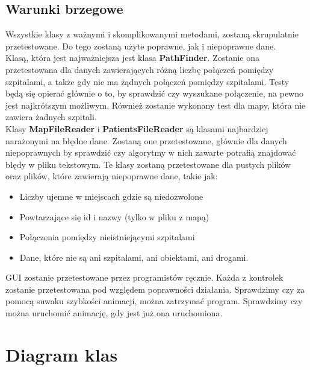 \documentclass[]{article}
\begin{document}
        \subsection{Warunki brzegowe}
        Wszystkie klasy z ważnymi i skomplikowanymi metodami, zostaną skrupulatnie przetestowane. Do tego zostaną użyte poprawne, jak i niepoprawne dane.
        \\
        Klasą, która jest najważniejsza jest klasa \textbf{PathFinder}. 
        Zostanie ona przetestowana dla danych zawierających różną liczbę połączeń pomiędzy szpitalami, a także gdy nie ma żądnych połączeń pomiędzy szpitalami.
        Testy będą się opierać głównie o to, by sprawdzić czy wyszukane połączenie, na pewno jest najkrótszym możliwym.
        Również zostanie wykonany test dla mapy, która nie zawiera żadnych szpitali.
        \\
        Klasy \textbf{MapFileReader} i \textbf{PatientsFileReader} są klasami najbardziej narażonymi na błędne dane.
        Zostaną one przetestowane, głównie dla danych niepoprawnych by sprawdzić
        czy algorytmy w nich zawarte potrafią znajdować błędy w pliku tekstowym.
        Te klasy zostaną przetestowane dla pustych plików oraz plików, które zawierają niepoprawne dane, takie jak:
        \begin{itemize}
            \item Liczby ujemne w miejscach gdzie są niedozwolone
            \item Powtarzające się id i nazwy (tylko w pliku z mapą)
            \item Połączenia pomiędzy nieistniejącymi szpitalami
            \item Dane, które nie są ani szpitalami, ani obiektami, ani drogami.
        \end{itemize}
        GUI zostanie przetestowane przez programistów ręcznie.
        Każda z kontrolek zostanie przetestowana pod względem poprawności działania.
        Sprawdzimy czy za pomocą suwaku szybkości animacji, można zatrzymać program.
        Sprawdzimy czy można uruchomić animację, gdy jest już ona uruchomiona.
        
    
    \section{Diagram klas} %
\end{document}
